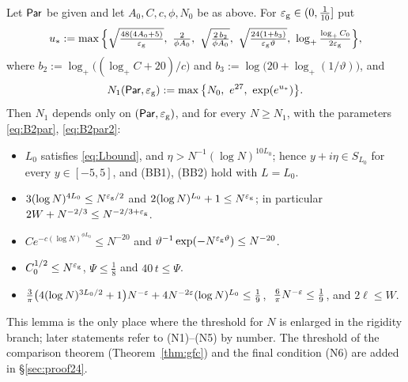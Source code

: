 \begin{lemma}\label{lem:N0}
Let $\mathsf{Par}$ be given and let $A_0,C,c,\phi,N_0$ be as above. For $\varepsilon_{\mathrm g}\in(0,\frac1{10}]$ put
\begin{equation}\label{eq:B2ustar}
u_*:=\max\Big\{\sqrt{\tfrac{48(4A_0+5)}{\eg}},\ \tfrac2{\phi A_0},\ \sqrt{\tfrac{2\,b_2}{\phi A_0}},\ \sqrt{\tfrac{24(1+b_3)}{\eg\vartheta}},\ \log_+\tfrac{\log_+C_0}{2\eg}\Big\},
\end{equation}
where $b_2:=\log_+\big((\log_+C+20)/c\big)$ and $b_3:=\log\big(20+\log_+(1/\vartheta)\big)$, and
\[
N_1(\Par,\eg):=\max\big\{N_0,\ e^{27},\ \exp(e^{u_*})\big\}.
\]
Then $N_1$ depends only on $(\mathsf{Par},\varepsilon_{\mathrm g})$, and for every $N\ge N_1$, with the parameters \eqref{eq:B2par}, \eqref{eq:B2par2}:
\begin{itemize}\itemsep1pt
\item[\textup{(N1)}] $L_0$ satisfies \eqref{eq:Lbound}, and $\eta>N^{-1}(\log N)^{10L_0}$; hence $y+i\eta\in S_{L_0}$ for every $y\in[-5,5]$, and \textup{(BB1), (BB2)} hold with $L=L_0$.
\item[\textup{(N2)}] $3(\log N)^{4L_0}\le N^{\varepsilon_{\mathrm g}/2}$ and $2(\log N)^{L_0}+1\le N^{\varepsilon_{\mathrm g}}$; in particular $2W+N^{-2/3}\le N^{-2/3+\varepsilon_{\mathrm g}}$.
\item[\textup{(N3)}] $Ce^{-c(\log N)^{\phi L_0}}\le N^{-20}$ and $\vartheta^{-1}\exp(-N^{\varepsilon_{\mathrm g}\vartheta})\le N^{-20}$.
\item[\textup{(N4)}] $C_0^{1/2}\le N^{\varepsilon_{\mathrm g}}$, $\Psi\le\frac18$ and $40\,t\le\Psi$.
\item[\textup{(N5)}] $\frac3\pi\big(4(\log N)^{3L_0/2}+1\big)N^{-\varepsilon}+4N^{-2\varepsilon}(\log N)^{L_0}\le\frac19$, $\ \frac6\pi N^{-\varepsilon}\le\frac19$, and $2\ell\le W$.
\end{itemize}
\end{lemma}
\noindent This lemma is the only place where the threshold for $N$ is enlarged in the rigidity branch; later statements refer to (N1)--(N5) by number.
The threshold of the comparison theorem (Theorem~\ref{thm:gfc}) and the final condition (N6) are added in \S\ref{sec:proof24}.

